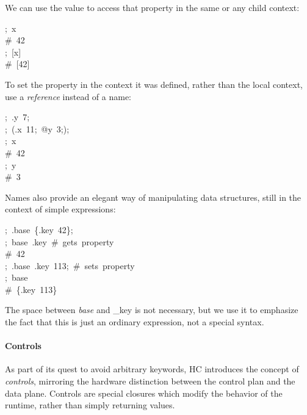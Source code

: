 \documentclass[preprint]{{acmart}}
\begin{document}
We can use the value  to access that property in the same or any child context:%
\begin{mdpre}%
\noindent;~x\\
{\#~42}\\
;~{}[x]\\
{\#~{}[42]}%
\end{mdpre}\noindent{}To set the property in the context it was defined, rather than the local context,
use a \emph{reference} instead of a name:
\begin{mdpre}%
\noindent;~.y~7;\\
;~(.x~{11};~{@y}~3;);\\
;~x\\
{\#~42}\\
;~y\\
{\#~3}%
\end{mdpre}\noindent{}Names also provide an elegant way of manipulating data structures, still
in the context of simple expressions:
\begin{mdpre}%
\noindent;~.base~\{.key~{42}\};\\
;~base~.key~{\#~gets~property}\\
{\#~42}\\
;~.base~.key~{113};~{\#~sets~property}\\
;~base\\
{\#~\{.key~113\}}%
\end{mdpre}\noindent{}The space between \emph{base} and \_key is not necessary, but we use it to
emphasize the fact that this is just an ordinary expression, not a
special syntax.

\paragraph{Controls}\label{sec-controls}%

\noindent{}As part of its quest to avoid arbitrary keywords, HC introduces the concept of
\emph{controls}, mirroring the hardware distinction between the control plan and the data plane.
Controls are special closures which modify the behavior of the runtime, rather than
simply returning values.%
\end{document}
